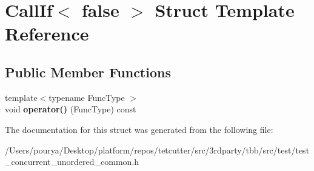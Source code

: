 \hypertarget{structCallIf_3_01false_01_4}{}\section{Call\+If$<$ false $>$ Struct Template Reference}
\label{structCallIf_3_01false_01_4}
\subsection*{Public Member Functions}
\begin{DoxyCompactItemize}
\item 
\hypertarget{structCallIf_3_01false_01_4_aa540447ff1b010c6b28a05516eea12e6}{}{\footnotesize template$<$typename Func\+Type $>$ }\\void {\bfseries operator()} (Func\+Type) const \label{structCallIf_3_01false_01_4_aa540447ff1b010c6b28a05516eea12e6}

\end{DoxyCompactItemize}


The documentation for this struct was generated from the following file\+:\begin{DoxyCompactItemize}
\item 
/\+Users/pourya/\+Desktop/platform/repos/tetcutter/src/3rdparty/tbb/src/test/test\+\_\+concurrent\+\_\+unordered\+\_\+common.\+h\end{DoxyCompactItemize}
